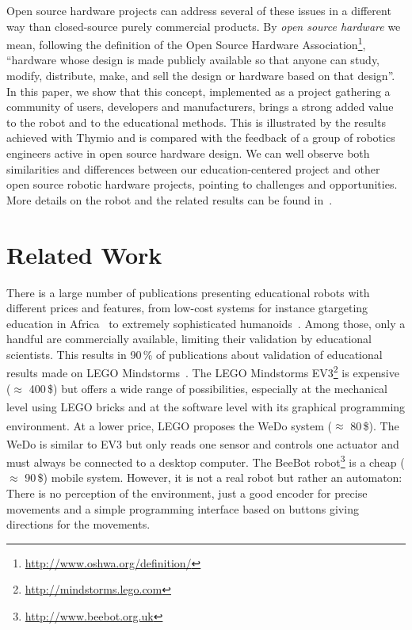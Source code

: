 \documentclass[letterpaper, 10 pt, conference]{ieeeconf}  %
\begin{document}
Open source hardware projects can address several of these issues in a different way than closed-source purely commercial products. 
By \textit{open source hardware} we mean, following the definition of the Open Source Hardware Association\footnote{\url{http://www.oshwa.org/definition/}}, ``hardware whose design is made publicly available so that anyone can study, modify, distribute, make, and sell the design or hardware based on that design''.
In this paper, we show that this concept, implemented as a project gathering a community of users, developers and manufacturers, brings a strong added value to the robot and to the educational methods.
This is illustrated by the results achieved with Thymio and is compared with the feedback of a group of robotics engineers active in open source hardware design.
We can well observe both similarities and differences between our education-centered project and other open source robotic hardware projects, pointing to challenges and opportunities.
More details on the robot and the related results can be found in~\cite{RiedoPhD, magnenat2014}.  

\section{Related Work}

There is a large number of publications presenting educational robots with different prices and features, from low-cost systems for instance gtargeting education in Africa~\cite{Rubenstein2015,Gyebi2015} to extremely sophisticated humanoids~\cite{Hood2015,Mazzoni2016}.
Among those, only a handful are commercially available, limiting their validation by educational scientists.
This results in 90\,\% of publications about validation of educational results made on LEGO\textsuperscript{\textregistered} Mindstorms\textsuperscript{\textregistered}~\cite{benitti2012exploring}.
The LEGO\textsuperscript{\textregistered} Mindstorms\textsuperscript{\textregistered} EV3\footnote{\url{http://mindstorms.lego.com}} is expensive ($\approx$ 400\,\$) but offers a wide range of possibilities, especially at the mechanical level using LEGO\textsuperscript{\textregistered} bricks and at the software level with its graphical programming environment. 
At a lower price, LEGO\textsuperscript{\textregistered} proposes the WeDo\textsuperscript{\textregistered} system ($\approx$ 80\,\$).
The WeDo\textsuperscript{\textregistered} is similar to EV3 but only reads one sensor and controls one actuator and must always be connected to a desktop computer.
The BeeBot robot\footnote{\url{http://www.beebot.org.uk}} is a cheap ($\approx$ 90\,\$) mobile system.
However, it is not a real robot but rather an automaton: There is no perception of the environment, just a good encoder for precise movements and a simple programming interface based on buttons giving directions for the movements.
\end{document}
